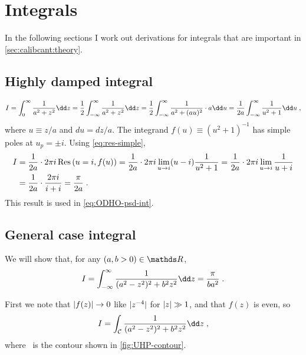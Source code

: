 \section{Integrals}
\label{sec:integrals}

In the following sections I work out derivations for integrals that
are important in \cref{sec:calibcant:theory}.

\subsection{Highly damped integral}
\label{sec:integrals:highly-damped}

\begin{equation}
  I = \iOInf{z}{\frac{1}{a^2 + z^2}}
    = \frac{1}{2} \iInfInf{z}{\frac{1}{a^2 + z^2}}
    = \frac{1}{2} \iInfInf{u}{\frac{1}{a^2 + (au)^2} \cdot a}
    = \frac{1}{2a} \iInfInf{u}{\frac{1}{u^2+1}} \;,
\end{equation}
where $u \equiv z/a$ and $du = dz/a$.  The integrand
$f(u)\equiv(u^2+1)^{-1}$ has simple poles at $u_p = \pm i$.  Using
\cref{eq:res-simple},
\begin{align}
  I &= \frac{1}{2a} \cdot 2 \pi i \operatorname{Res}\left({{u}={i}},{f(u)}\right)
    = \frac{1}{2a} \cdot 2 \pi i \lim_{{u} \rightarrow {i}} (u-i) \frac{1}{u^2+1}
    = \frac{1}{2a} \cdot 2 \pi i \lim_{{u} \rightarrow {i}} \frac{1}{u+i} \\
    &= \frac{1}{2a} \cdot \frac{2 \pi i}{i+i}
    = \frac{\pi}{2 a} \;.
\end{align}
This result is used in \cref{eq:ODHO-psd-int}.

\subsection{General case integral}
\label{sec:integrals:general}

We will show that, for any $(a,b > 0) \in \Reals$,
\begin{equation}
  I = \iInfInf{z}{\frac{1}{(a^2-z^2)^2 + b^2 z^2}} = \frac{\pi}{b a^2} \;.
\end{equation}
%

First we note that $\lvert {f(z)} \rvert \rightarrow 0$ like $\lvert {z^{-4}} \rvert$ for
$\lvert {z} \rvert \gg 1$, and that $f(z)$ is even, so
\begin{equation}
  I = \iC{\frac{1}{(a^2-z^2)^2 + b^2 z^2}} \;,
\end{equation}
where \C\ is the contour shown in \cref{fig:UHP-contour}.

